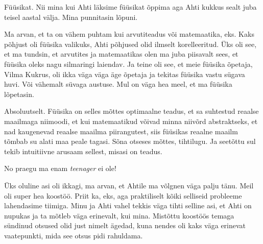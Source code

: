 
Füüsikat. Nii mina kui Ahti läksime füüsikat õppima aga Ahti kukkus sealt juba 
teisel aastal välja. Mina punnitasin lõpuni. 


Ma arvan, et ta on vähem puhtam kui arvutiteadus või matemaatika, eks. Kaks 
põhjust oli füüsika valikuks, Ahti põhjused olid ilmselt korelleeritud. Üks oli 
see, et ma tundsin, et  arvutites ja matemaatikas olen ma juba piisavalt sees, 
et füüsika oleks nagu silmaringi laiendav. Ja teine oli see, et meie füüsika 
õpetaja, Vilma Kukrus, oli ikka väga väga äge õpetaja 
ja tekitas füüsika vastu sügava huvi. Või vähemalt süvaga austuse. Mul on väga 
hea meel, et ma füüsika lõpetasin.


Absoluutselt. Füüsika on selles mõttes optimaalne teadus, et sa suhtestud 
reaalse maailmaga niimoodi, et kui matemaatikud võivad minna niivõrd 
abstraktseks, et nad kaugenevad reaalse maailma piirangutest, siis füüsikas 
reaalne maailm tõmbab su alati maa peale tagasi. Sõna otseses mõttes, 
tihtilugu. Ja seetõttu sul tekib intuitiivne arusaam sellest, misasi on teadus. 


No praegu ma enam \emph{teenager} ei ole!


Üks oluline asi oli ikkagi, ma arvan, et Ahtile ma võlgnen väga palju tänu. 
Meil oli super hea koostöö. Priit ka, eks, aga praktiliselt kõiki selliseid 
probleeme lahendasime tiimiga. Minu  ja Ahti vahel tekkis väga tihti selline 
asi, et Ahti on nupukas ja ta mõtleb väga erinevalt, kui mina. Mistõttu 
koostöös temaga sündinud otsused olid just nimelt ägedad, kuna nendes oli kaks 
väga erinevat vaatepunkti, mida see otsus pidi rahuldama.


